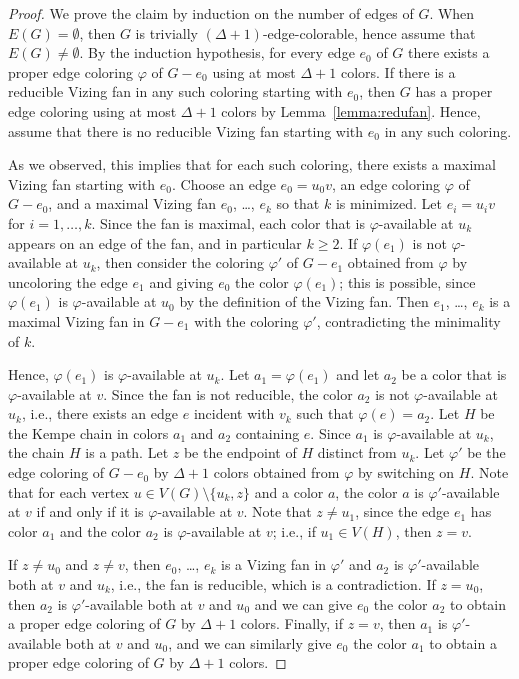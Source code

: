 \documentclass[12pt,twoside,openright,a4paper]{book}
\begin{document}
\begin{proof}
We prove the claim by induction on the number of edges of $G$.  When $E(G)=\emptyset$, then $G$ is trivially $(\Delta+1)$-edge-colorable,
hence assume that $E(G)\neq\emptyset$.  By the induction hypothesis, for every edge $e_0$ of $G$ there exists
a proper edge coloring $\varphi$ of $G-e_0$ using at most $\Delta+1$ colors.  If there is a reducible Vizing fan in any such
coloring starting with $e_0$, then $G$ has a proper edge coloring using at most $\Delta+1$ colors by Lemma~\ref{lemma:redufan}.
Hence, assume that there is no reducible Vizing fan starting with $e_0$ in any such coloring.

As we observed, this implies that for each such coloring, there exists a maximal Vizing fan starting with $e_0$.
Choose an edge $e_0=u_0v$, an edge coloring $\varphi$ of $G-e_0$, and a maximal Vizing fan $e_0$, \ldots, $e_k$
so that $k$ is minimized.  Let $e_i=u_iv$ for $i=1,\ldots,k$.  Since the fan is maximal, each color that is $\varphi$-available
at $u_k$ appears on an edge of the fan, and in particular $k\ge 2$.
If $\varphi(e_1)$ is not $\varphi$-available at $u_k$, then consider the coloring $\varphi'$ of $G-e_1$
obtained from $\varphi$ by uncoloring the edge $e_1$ and giving $e_0$ the color $\varphi(e_1)$; this is possible, since
$\varphi(e_1)$ is $\varphi$-available at $u_0$ by the definition of the Vizing fan.  Then $e_1$, \ldots, $e_k$
is a maximal Vizing fan in $G-e_1$ with the coloring $\varphi'$, contradicting the minimality of $k$.

Hence, $\varphi(e_1)$ is $\varphi$-available at $u_k$.  Let $a_1=\varphi(e_1)$ and let $a_2$ be a color that
is $\varphi$-available at $v$.  Since the fan is not reducible, the color $a_2$ is not $\varphi$-available at $u_k$,
i.e., there exists an edge $e$ incident with $v_k$ such that $\varphi(e)=a_2$.
Let $H$ be the Kempe chain in colors $a_1$ and $a_2$ containing $e$.  Since $a_1$ is $\varphi$-available at $u_k$,
the chain $H$ is a path.   Let $z$ be the endpoint of $H$ distinct from $u_k$.
Let $\varphi'$ be the edge coloring of $G-e_0$ by $\Delta+1$ colors obtained from $\varphi$
by switching on $H$.  Note that for each vertex $u\in V(G)\setminus\{u_k,z\}$ and a color $a$, the color $a$ is $\varphi'$-available
at $v$ if and only if it is $\varphi$-available at $v$.  Note that $z\neq u_1$, since the edge $e_1$ has color $a_1$
and the color $a_2$ is $\varphi$-available at $v$; i.e., if $u_1\in V(H)$, then $z=v$.

If $z\neq u_0$ and $z\neq v$, then $e_0$, \ldots, $e_k$ is a Vizing fan in $\varphi'$ and $a_2$ is $\varphi'$-available
both at $v$ and $u_k$, i.e., the fan is reducible, which is a contradiction.  If $z=u_0$, then $a_2$ is $\varphi'$-available
both at $v$ and $u_0$ and we can give $e_0$ the color $a_2$ to obtain a proper edge coloring of $G$ by $\Delta+1$ colors.
Finally, if $z=v$, then $a_1$ is $\varphi'$-available both at $v$ and $u_0$, and we can similarly
give $e_0$ the color $a_1$ to obtain a proper edge coloring of $G$ by $\Delta+1$ colors.
\end{proof}
\end{document}
